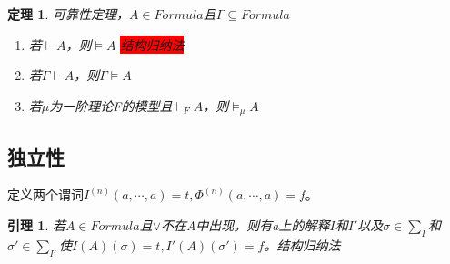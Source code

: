 \documentclass[a4paper]{ctexart}
\newtheorem{thm}{\hspace{2em}定理}[subsection]
\newtheorem{lem}{\hspace{2em}引理}
\newcommand{\shade}[1]{\colorbox{shadecolor}{#1}}
\newcommand{\redshade}[1]{\colorbox{red}{#1}}
\begin{document}
\begin{thm}
  可靠性定理，$A\in Formula$且$\Gamma\subseteq Formula$
  \begin{enumerate}[itemindent=2em]
    \item 若$\vdash A$，则$\models A$  \redshade{结构归纳法}
    \item 若$\Gamma\vdash A$，则$\Gamma\models A$
    \item 若$\mu$为一阶理论F的模型且$\vdash_FA$，则$\models_\mu A$
  \end{enumerate}
\end{thm}

\subsection{独立性}
定义两个谓词$I^{(n)}(a,\cdots,a)=t,\Phi^{(n)}(a,\cdots,a)=f$。

\begin{lem}
  若$A\in Formula$且$\vee$不在A中出现，则有a上的解释$I$和$I'$以及$\sigma\in\sum_I$和$\sigma '\in\sum_{I'}$使$I(A)(\sigma)=t,I'(A)(\sigma')=f$。\shade{结构归纳法}
\end{lem}
\end{document}
